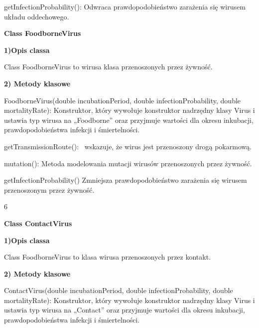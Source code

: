 \documentclass[a4paper]{article}
\begin{document}
\foreignlanguage{polish}{getInfectionProbability(): Odwraca prawdopodobieństwo zarażenia się wirusem układu
oddechowego.}


\bigskip


\bigskip

{\centering
\foreignlanguage{polish}{\textbf{Class FoodborneVirus}}
\par}
\vspace{6pt}
\foreignlanguage{polish}{\textbf{1)Opis classa}}

\foreignlanguage{polish}{Class FoodborneVirus to wirusa klasa przenoszonych przez żywność.}


\bigskip

\foreignlanguage{polish}{\textbf{2) Metody klasowe}}

\foreignlanguage{polish}{FoodborneVirus(double incubationPeriod, double infectionProbability, double mortalityRate):
Konstruktor, który wywołuje konstruktor nadrzędny klasy Virus i ustawia typ wirusa na „Foodborne” oraz przyjmuje
wartości dla okresu inkubacji, prawdopodobieństwa infekcji i śmiertelności.}

\foreignlanguage{polish}{getTransmissionRoute(): \ wskazuje, że wirus jest przenoszony drogą pokarmową.}

\foreignlanguage{polish}{mutation(): Metoda modelowania mutacji wirusów przenoszonych przez żywność.}

\foreignlanguage{polish}{getInfectionProbability() Zmniejsza prawdopodobieństwo zarażenia się wirusem przenoszonym przez
żywność.}


\bigskip

\bigskip
\bigskip
\bigskip
\bigskip
\bigskip
\bigskip
\bigskip
\bigskip
\bigskip
\bigskip
\bigskip
\bigskip
\bigskip
\bigskip

\begin{center}
	6
\end{center}
\newpage
{\centering
\foreignlanguage{polish}{\textbf{Class ContactVirus}}
\par}
\vspace{6pt}
\foreignlanguage{polish}{\textbf{1)Opis classa}}

\foreignlanguage{polish}{Class FoodborneVirus to klasa wirusa przenoszonych przez kontakt.}


\bigskip

\foreignlanguage{polish}{\textbf{2) Metody klasowe}}

\foreignlanguage{polish}{ContactVirus(double incubationPeriod, double infectionProbability, double mortalityRate):
Konstruktor, który wywołuje konstruktor nadrzędny klasy Virus i ustawia typ wirusa na „Contact” oraz przyjmuje wartości
dla okresu inkubacji, prawdopodobieństwa infekcji i śmiertelności.}
\end{document}
